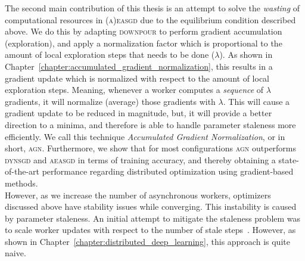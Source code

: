 The second main contribution of this thesis is an attempt to solve the \emph{wasting} of computational resources in \textsc{(a)easgd} due to the equilibrium condition described above. We do this by adapting \textsc{downpour} to perform gradient accumulation (exploration), and apply a normalization factor which is proportional to the amount of local exploration steps that needs to be done ($\lambda$). As shown in Chapter~\ref{chapter:accumulated_gradient_normalization}, this results in a gradient update which is normalized with respect to the amount of local exploration steps. Meaning, whenever a worker computes a \emph{sequence} of $\lambda$ gradients, it will normalize (average) those gradients with $\lambda$. This will cause a gradient update to be reduced in magnitude, but, it will provide a better direction to a minima, and therefore is able to handle parameter staleness more efficiently. We call this technique \emph{Accumulated Gradient Normalization}, or in short, \textsc{agn}. Furthermore, we show that for most configurations \textsc{agn} outperforms \textsc{dynsgd} and \textsc{aeasgd} in terms of training accuracy, and thereby obtaining a state-of-the-art performance regarding distributed optimization using gradient-based methods.\\

However, as we increase the number of asynchronous workers, optimizers discussed above have stability issues while converging. This instability is caused by parameter staleness. An initial attempt to mitigate the staleness problem was to scale worker updates with respect to the number of stale steps~\cite{jiang2017heterogeneity}. However, as shown in Chapter~\ref{chapter:distributed_deep_learning}, this approach is quite naive.

